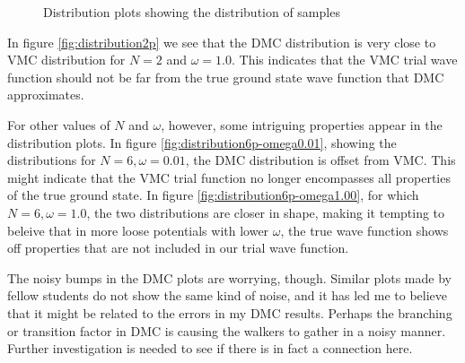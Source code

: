\documentclass[aps,prb,twocolumn,floatfix]{revtex4}
\begin{document}
\begin{figure*}
    \centering
     \label{fig:distribution2p}
     \label{fig:distribution6p-omega0.01}
     \label{fig:distribution6p-omega1.00}
    \caption{Distribution plots showing the distribution of samples }
    \label{fig:distribution}
\end{figure*}

In figure \ref{fig:distribution2p} we see that the DMC distribution is very close to VMC distribution for $N=2$ and $\omega = 1.0$. This indicates that the VMC trial wave function should not be far from the true ground state wave function that DMC approximates. 

For other values of $N$ and $\omega$, however, some intriguing properties appear in the distribution plots. In figure \ref{fig:distribution6p-omega0.01}, showing the distributions for $N=6, \omega=0.01$, the DMC distribution is offset from VMC. This might indicate that the VMC trial function no longer encompasses all properties of the true ground state. In figure \ref{fig:distribution6p-omega1.00}, for which $N = 6, \omega=1.0$, the two distributions are closer in shape, making it tempting to beleive that in more loose potentials with lower $\omega$, the true wave function shows off properties that are not included in our trial wave function.

The noisy bumps in the DMC plots are worrying, though. Similar plots made by fellow students do not show the same kind of noise, and it has led me to believe that it might be related to the errors in my DMC results. Perhaps the branching or transition factor in DMC is causing the walkers to gather in a noisy manner. Further investigation is needed to see if there is in fact a connection here.
\end{document}
